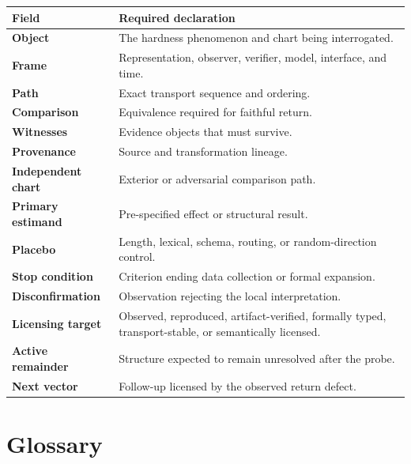 \documentclass[12pt,openany]{book}
\theoremstyle{remark}
\begin{document}
\begin{longtable}{>{\bfseries}p{}p{}}
\toprule
Field & Required declaration \\
\midrule
\endhead
Object & The hardness phenomenon and chart being interrogated. \\
Frame & Representation, observer, verifier, model, interface, and time. \\
Path & Exact transport sequence and ordering. \\
Comparison & Equivalence required for faithful return. \\
Witnesses & Evidence objects that must survive. \\
Provenance & Source and transformation lineage. \\
Independent chart & Exterior or adversarial comparison path. \\
Primary estimand & Pre-specified effect or structural result. \\
Placebo & Length, lexical, schema, routing, or random-direction control. \\
Stop condition & Criterion ending data collection or formal expansion. \\
Disconfirmation & Observation rejecting the local interpretation. \\
Licensing target & Observed, reproduced, artifact-verified, formally typed, transport-stable, or semantically licensed. \\
Active remainder & Structure expected to remain unresolved after the probe. \\
Next vector & Follow-up licensed by the observed return defect. \\
\bottomrule
\end{longtable}

\chapter{Glossary}
\label{app:glossary}
\end{document}
